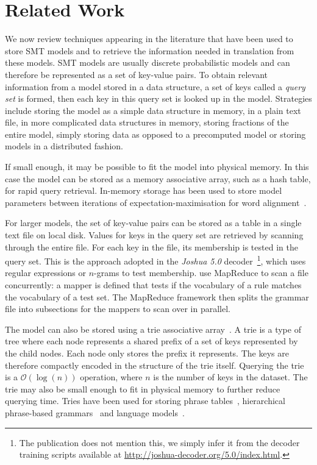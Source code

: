 \section{Related Work}
\label{sec:relatedwork}

We now review techniques appearing in the literature that have been used to
store SMT models and to retrieve the information needed in translation from
these models. SMT models are usually discrete probabilistic models and can
therefore be represented as a set of key-value pairs. To obtain relevant
information from a model stored in a data structure, a set of keys called a
\emph{query set} is formed, then each key in this query set is looked up in the
model. Strategies include storing the model as a simple data structure in
memory, in a plain text file, in more complicated data structures in memory,
storing fractions of the entire model, simply storing data as opposed to a
precomputed model or storing models in a distributed fashion.

If small enough, it may be possible to fit the model into physical memory. In
this case the model can be stored as a memory associative array, such as a hash
table, for rapid query retrieval. In-memory storage has been used to store model
parameters between iterations of expectation-maximisation for word
alignment~\citep{dyer-cordova-mont-lin:2008:WMT,lin-dyer:2010:book}.

For larger models, the set of key-value pairs can be stored as a table in a
single text file on local disk. Values for keys in the query set are retrieved
by scanning through the entire file. For each key in the file, its membership is
tested in the query set. This is the approach adopted in the \emph{Joshua 5.0}
decoder~\citep{post-ganitkevitch-orland-weese-cao-callisonburch:2013:WMT}\footnote{The
publication does not mention this, we simply infer it from the decoder training
scripts available at \url{http://joshua-decoder.org/5.0/index.html}.}, which
uses regular expressions or $n$-grams to test membership.
\citet{venugopal-zollmann:2009:PBML} use MapReduce to scan a file concurrently:
a mapper is defined that tests if the vocabulary of a rule matches the
vocabulary of a test set. The MapReduce framework then splits the grammar file
into subsections for the mappers to scan over in parallel.

The model can also be stored using a trie associative
array~\citep{fredkin:1960:ACM}. A trie is a type of tree where each node
represents a shared prefix of a set of keys represented by the child nodes. Each
node only stores the prefix it represents. The keys are therefore compactly
encoded in the structure of the trie itself. Querying the trie is a
$\mathcal{O}(\log(n))$ operation, where $n$ is the number of keys in the
dataset. The trie may also be small enough to fit in physical memory to further
reduce querying time. Tries have been used for storing phrase
tables~\citep{zens-ney:2007:HLTNAACL}, hierarchical phrase-based
grammars~\citep{ganitkevitch-cao-weese-post-callisonburch:2012:WMT} and
language models~\citep{pauls-klein:2011:HLTACL,heafield:2011:WMT}.

